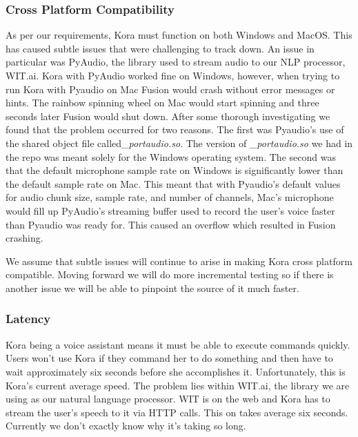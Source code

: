 \documentclass[onecolumn, draftclsnofoot,10pt, compsoc]{IEEEtran}
\begin{document}
	    \subsubsection{Cross Platform Compatibility}
		    As per our requirements, Kora must function on both Windows and MacOS.
		    This has caused subtle issues that were challenging to track down.
		    An issue in particular was PyAudio, the library used to stream audio to our NLP processor, WIT.ai.
		    Kora with PyAudio worked fine on Windows, however, when trying to run Kora with Pyaudio on Mac Fusion would crash without error messages or hints.
		    The rainbow spinning wheel on Mac would start spinning and three seconds later Fusion would shut down.
		    After some thorough investigating we found that the problem occurred for two reasons.
		    The first was Pyaudio's use of the shared object file called\textit{\_portaudio.so}.
		    The version of \textit{\_portaudio.so} we had in the repo was meant solely for the Windows operating system.
		   	The second was that the default microphone sample rate on Windows is significantly lower than the default sample rate on Mac.
		   	This meant that with Pyaudio's default values for audio chunk size, sample rate, and number of channels, Mac's microphone would fill up PyAudio's streaming buffer used to record the user's voice faster than Pyaudio was ready for.
		    This caused an overflow which resulted in Fusion crashing.
		    
		    We assume that subtle issues will continue to arise in making Kora cross platform compatible.
		    Moving forward we will do more incremental testing so if there is another issue we will be able to pinpoint the source of it much faster. 
	    
	    \subsubsection{Latency}
		    Kora being a voice assistant means it must be able to execute commands quickly.
		    Users won't use Kora if they command her to do something and then have to wait approximately six seconds before she accomplishes it.
		    Unfortunately, this is Kora's current average speed.
		    The problem lies within WIT.ai, the library we are using as our natural language processor.
		    WIT is on the web and Kora has to stream the user's speech to it via HTTP calls.
		    This on takes average six seconds.
		    Currently we don't exactly know why it's taking so long.
		    
\end{document}
